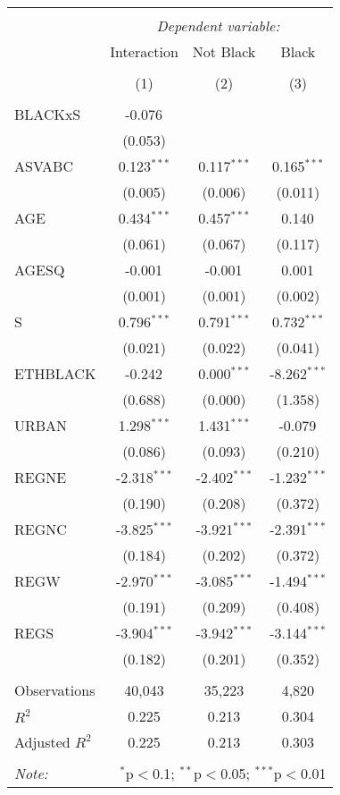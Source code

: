 \begin{table}[!htbp] \centering
\begin{tabular}{@{\extracolsep{5pt}}lccc}
\\[-1.8ex]\hline
\hline \\[-1.8ex]
& \multicolumn{3}{c}{\textit{Dependent variable:}} \
\cr \cline{3-4}
\\[-1.8ex] & \multicolumn{1}{c}{Interaction} & \multicolumn{1}{c}{Not Black} & \multicolumn{1}{c}{Black}  \\
\\[-1.8ex] & (1) & (2) & (3) \\
\hline \\[-1.8ex]
 BLACKxS & -0.076$^{}$ & & \\
  & (0.053) & & \\
 ASVABC & 0.123$^{***}$ & 0.117$^{***}$ & 0.165$^{***}$ \\
  & (0.005) & (0.006) & (0.011) \\
 AGE & 0.434$^{***}$ & 0.457$^{***}$ & 0.140$^{}$ \\
  & (0.061) & (0.067) & (0.117) \\
 AGESQ & -0.001$^{}$ & -0.001$^{}$ & 0.001$^{}$ \\
  & (0.001) & (0.001) & (0.002) \\
 S & 0.796$^{***}$ & 0.791$^{***}$ & 0.732$^{***}$ \\
  & (0.021) & (0.022) & (0.041) \\
 ETHBLACK & -0.242$^{}$ & 0.000$^{***}$ & -8.262$^{***}$ \\
  & (0.688) & (0.000) & (1.358) \\
 URBAN & 1.298$^{***}$ & 1.431$^{***}$ & -0.079$^{}$ \\
  & (0.086) & (0.093) & (0.210) \\
 REGNE & -2.318$^{***}$ & -2.402$^{***}$ & -1.232$^{***}$ \\
  & (0.190) & (0.208) & (0.372) \\
 REGNC & -3.825$^{***}$ & -3.921$^{***}$ & -2.391$^{***}$ \\
  & (0.184) & (0.202) & (0.372) \\
 REGW & -2.970$^{***}$ & -3.085$^{***}$ & -1.494$^{***}$ \\
  & (0.191) & (0.209) & (0.408) \\
 REGS & -3.904$^{***}$ & -3.942$^{***}$ & -3.144$^{***}$ \\
  & (0.182) & (0.201) & (0.352) \\
\hline \\[-1.8ex]
 Observations & 40,043 & 35,223 & 4,820 \\
 $R^2$ & 0.225 & 0.213 & 0.304 \\
 Adjusted $R^2$ & 0.225 & 0.213 & 0.303 \\
\hline
\hline \\[-1.8ex]
\textit{Note:} & \multicolumn{3}{r}{$^{*}$p$<$0.1; $^{**}$p$<$0.05; $^{***}$p$<$0.01} \\
\end{tabular}
\end{table}